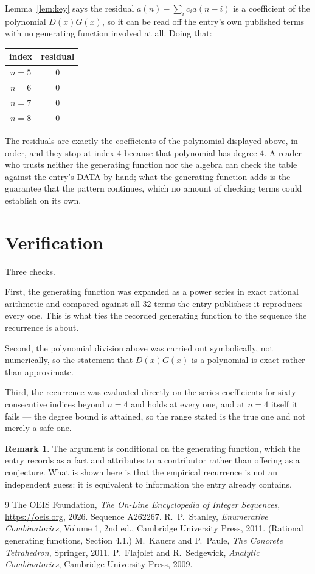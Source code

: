 \documentclass[11pt,a4paper]{article}
\theoremstyle{plain}
\theoremstyle{definition}
\newtheorem{remark}[theorem]{Remark}
\begin{document}
Lemma~\ref{lem:key} says the residual $a(n)-\sum_ic_ia(n-i)$ is a coefficient of the
polynomial $D(x)G(x)$, so it can be read off the entry's own published terms with no
generating function involved at all. Doing that:
\begin{center}
\begin{tabular}{cc}
index & residual \\ \hline
$n=5$ & $0$ \\
$n=6$ & $0$ \\
$n=7$ & $0$ \\
$n=8$ & $0$
\end{tabular}
\end{center}
The residuals are exactly the coefficients of the polynomial displayed above, in order, and
they stop at index $4$ because that polynomial has degree $4$. A reader who trusts
neither the generating function nor the algebra can check the table against the entry's DATA
by hand; what the generating function adds is the guarantee that the pattern continues, which
no amount of checking terms could establish on its own.

\section{Verification}

Three checks.

First, the generating function was expanded as a power series in exact rational arithmetic and
compared against all $32$ terms the entry publishes: it reproduces every one. This is
what ties the recorded generating function to the sequence the recurrence is about.

Second, the polynomial division above was carried out symbolically, not numerically, so the
statement that $D(x)G(x)$ is a polynomial is exact rather than approximate.

Third, the recurrence was evaluated directly on the series coefficients for sixty consecutive
indices beyond $n=4$ and holds at every one, and at $n=4$ itself it fails --- the
degree bound is attained, so the range stated is the true one and not merely a safe one.

\begin{remark}
The argument is conditional on the generating function, which the entry records as a fact and
attributes to a contributor rather than offering as a conjecture. What is shown here is that
the empirical recurrence is not an independent guess: it is equivalent to information the
entry already contains.
\end{remark}

\begin{thebibliography}{9}
 The OEIS Foundation, \emph{The On-Line Encyclopedia of Integer
Sequences}, \url{https://oeis.org}, 2026. Sequence A262267.
 R.~P.~Stanley, \emph{Enumerative Combinatorics}, Volume 1, 2nd ed.,
Cambridge University Press, 2011. (Rational generating functions, Section 4.1.)
 M.~Kauers and P.~Paule, \emph{The Concrete Tetrahedron}, Springer, 2011.
 P.~Flajolet and R.~Sedgewick, \emph{Analytic Combinatorics}, Cambridge
University Press, 2009.
\end{thebibliography}
\end{document}
